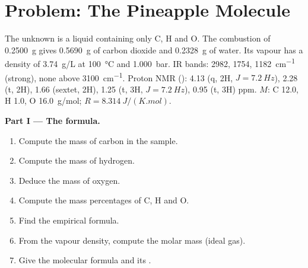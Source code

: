 \section{Problem: The Pineapple Molecule}

\begin{problem}
\label{pb:b1:structure-spectroscopy:1}
The unknown is a liquid containing only C, H and O. The combustion of
\qty{0.2500}{g} gives \qty{0.5690}{g} of carbon dioxide and
\qty{0.2328}{g} of water. Its vapour has a density of \qty{3.74}{g/L} at
\qty{100}{\celsius} and \qty{1.000}{bar}.  IR bands: 2982,
1754, \qty{1182}{cm^{-1}} (strong), none above
\qty{3100}{cm^{-1}}. Proton NMR (): 4.13 (q, 2H, $J = \qty{7.2}{Hz}$),
2.28 (t, 2H), 1.66 (sextet, 2H), 1.25 (t, 3H, $J = \qty{7.2}{Hz}$), 0.95
(t, 3H) ppm. $M$: C 12.0, H 1.0, O \qty{16.0}{g/mol}; $R =
\qty{8.314}{J/(K.mol)}$.

\begin{center}
\end{center}

\medskip
\noindent\textbf{Part I --- The formula.}
\begin{enumerate}
  \item Compute the mass of carbon in the sample.
  \item Compute the mass of hydrogen.
  \item Deduce the mass of oxygen.
  \item Compute the mass percentages of C, H and O.
  \item Find the empirical formula.
  \item From the vapour density, compute the molar mass (ideal gas).
  \item Give the molecular formula and its .
\end{enumerate}


\end{problem}
